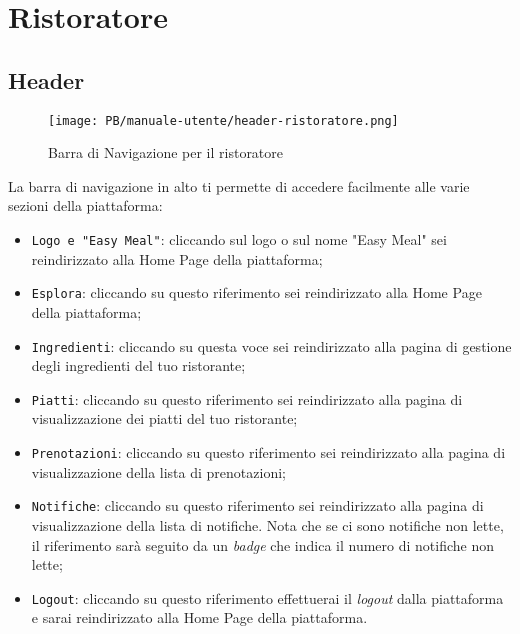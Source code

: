 \section{Ristoratore}

\subsection{Header}

\begin{figure}[htbp]
    \centering
	\texttt{[image: PB/manuale-utente/header-ristoratore.png]}
    \caption{Barra di Navigazione per il ristoratore}
\end{figure}

La barra di navigazione in alto ti permette di accedere facilmente alle varie 
sezioni della piattaforma:
\begin{itemize}
	\item \texttt{Logo e "Easy Meal"}: cliccando sul logo o sul nome "Easy Meal"
		sei reindirizzato alla Home Page della piattaforma;

	\item \texttt{Esplora}: cliccando su questo riferimento sei reindirizzato
		alla Home Page della piattaforma;

	\item \texttt{Ingredienti}: cliccando su questa voce sei reindirizzato alla
		pagina di gestione degli ingredienti del tuo ristorante;

	\item \texttt{Piatti}: cliccando su questo riferimento sei reindirizzato
		alla pagina di visualizzazione dei piatti del tuo ristorante;

	\item \texttt{Prenotazioni}: cliccando su questo riferimento sei 
		reindirizzato alla pagina di visualizzazione della lista di
		prenotazioni;

	\item \texttt{Notifiche}: cliccando su questo riferimento sei reindirizzato
		alla pagina di visualizzazione della lista di notifiche. Nota che se ci
		sono notifiche non lette, il riferimento sarà seguito da un \textit{badge} che
		indica il numero di notifiche non lette;

	\item \texttt{Logout}: cliccando su questo riferimento effettuerai il \textit{logout}
		dalla piattaforma e sarai reindirizzato alla Home Page della 
		piattaforma.
\end{itemize}

